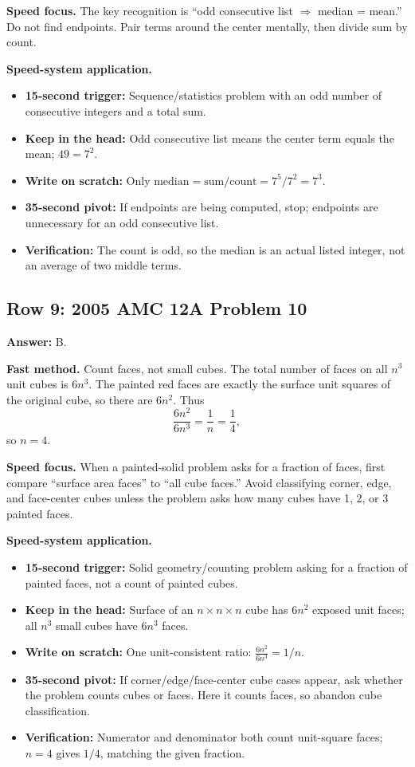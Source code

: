 \documentclass[11pt]{article}
\begin{document}
\textbf{Speed focus.} The key recognition is ``odd consecutive list \(\Rightarrow\) median = mean.'' Do not find endpoints. Pair terms around the center mentally, then divide sum by count.

\textbf{Speed-system application.}
\begin{itemize}
  \item \textbf{15-second trigger:} Sequence/statistics problem with an odd number of consecutive integers and a total sum.
  \item \textbf{Keep in the head:} Odd consecutive list means the center term equals the mean; \(49=7^2\).
  \item \textbf{Write on scratch:} Only \(\text{median}=\text{sum}/\text{count}=7^5/7^2=7^3\).
  \item \textbf{35-second pivot:} If endpoints are being computed, stop; endpoints are unnecessary for an odd consecutive list.
  \item \textbf{Verification:} The count is odd, so the median is an actual listed integer, not an average of two middle terms.
\end{itemize}

\subsection{Row 9: 2005 AMC 12A Problem 10}

\textbf{Answer:} B.

\textbf{Fast method.} Count faces, not small cubes. The total number of faces on all \(n^3\) unit cubes is \(6n^3\). The painted red faces are exactly the surface unit squares of the original cube, so there are \(6n^2\). Thus
\[
\frac{6n^2}{6n^3}=\frac{1}{n}=\frac14,
\]
so \(n=4\).

\textbf{Speed focus.} When a painted-solid problem asks for a fraction of faces, first compare ``surface area faces'' to ``all cube faces.'' Avoid classifying corner, edge, and face-center cubes unless the problem asks how many cubes have 1, 2, or 3 painted faces.

\textbf{Speed-system application.}
\begin{itemize}
  \item \textbf{15-second trigger:} Solid geometry/counting problem asking for a fraction of painted faces, not a count of painted cubes.
  \item \textbf{Keep in the head:} Surface of an \(n\times n\times n\) cube has \(6n^2\) exposed unit faces; all \(n^3\) small cubes have \(6n^3\) faces.
  \item \textbf{Write on scratch:} One unit-consistent ratio: \(\frac{6n^2}{6n^3}=1/n\).
  \item \textbf{35-second pivot:} If corner/edge/face-center cube cases appear, ask whether the problem counts cubes or faces. Here it counts faces, so abandon cube classification.
  \item \textbf{Verification:} Numerator and denominator both count unit-square faces; \(n=4\) gives \(1/4\), matching the given fraction.
\end{itemize}
\end{document}
